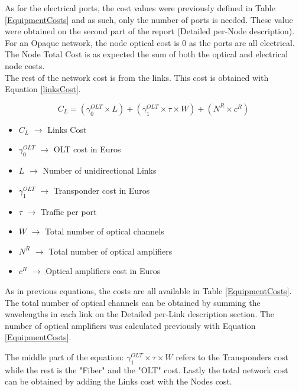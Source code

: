 	As for the electrical ports, the cost values were previously defined in Table \ref{EquipmentCosts} and as such, only the number of ports is needed. These value were obtained on the second part of the report (Detailed per-Node description). \\
	
	For an Opaque network, the node optical cost is 0 as the ports are all electrical. \\
	
	The Node Total Cost is as expected the sum of both the optical and electrical node costs. \\
	
	The rest of the network cost is from the links. This cost is obtained with Equation \ref{linksCost}.
	
	\begin{equation}
		C_L = \left(\gamma_0^{OLT} \times L\right) + \left(\gamma_1^{OLT} \times \tau \times W\right) + \left(N^R \times c^R\right)
		\label{linksCost}
	\end{equation}	
	
	\begin{itemize}
		\item{$C_L$				$\rightarrow$	Links Cost}
		\item{$\gamma_0^{OLT}$	$\rightarrow$	OLT cost in Euros}
		\item{$L$				$\rightarrow$	Number of unidirectional Links}
		\item{$\gamma_1^{OLT}$	$\rightarrow$	Transponder cost in Euros}
		\item{$\tau$			$\rightarrow$	Traffic per port}
		\item{$W$				$\rightarrow$	Total number of optical channels}
		\item{$N^R$				$\rightarrow$	Total number of optical amplifiers}
		\item{$c^R$				$\rightarrow$	Optical amplifiers cost in Euros}
	\end{itemize}
	
	As in previous equations, the costs are all available in Table \ref{EquipmentCosts}. The total number of optical channels can be obtained by summing the wavelengths in each link on the Detailed per-Link description section. The number of optical amplifiers was calculated previously with Equation \ref{EquipmentCosts}.
	
	The middle part of the equation: $\gamma_1^{OLT} \times \tau \times W$ refers to the Transponders cost while the rest is the "Fiber" and the "OLT" cost.	Lastly the total network cost can be obtained by adding the Links cost with the Nodes cost.\\
	
